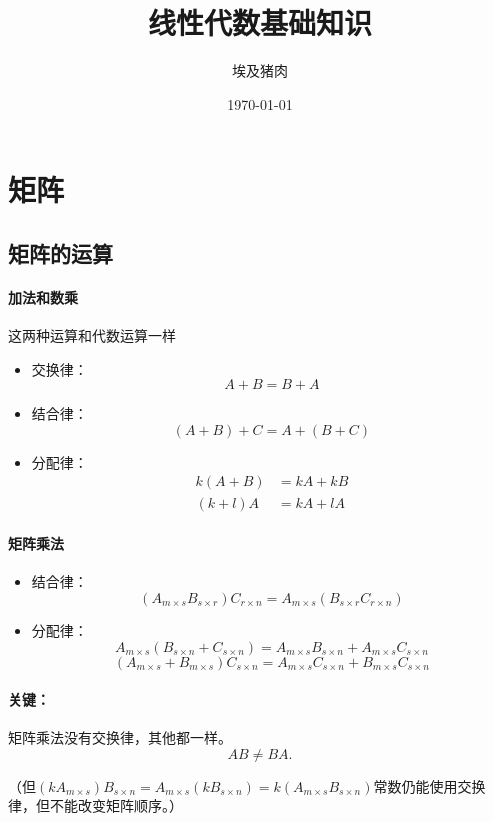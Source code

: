 \documentclass[UTF8]{ctexart}
\title{线性代数基础知识}
\author{埃及猪肉}
\date{\today}
\begin{document}
\maketitle
\tableofcontents

\section{矩阵}

\subsection{矩阵的运算}

\paragraph{加法和数乘}
这两种运算和代数运算一样
\begin{itemize}
    \item 交换律：
        \[A + B = B + A\]
    \item 结合律：
        \[(A + B) + C = A + (B + C)\]
    \item 分配律：
        \begin{align*}
        k(A + B) &= kA + kB \\
        (k + l)A &= kA + lA
        \end{align*}
\end{itemize}

\paragraph{矩阵乘法}
\begin{itemize}
    \item 结合律：
        \[
        (A_{m \times s} B_{s \times r}) C_{r \times n} = A_{m \times s} (B_{s \times r} C_{r \times n})
        \]
    \item 分配律：
        \[
        A_{m \times s} (B_{s \times n} + C_{s \times n}) = A_{m \times s} B_{s \times n} + A_{m \times s} C_{s \times n}
        \]
        \[
        (A_{m \times s} + B_{m \times s}) C_{s \times n} = A_{m \times s} C_{s \times n} + B_{m \times s} C_{s \times n}
        \]
\end{itemize}

{\color{red}
\paragraph{关键：}矩阵乘法没有交换律，其他都一样。
\[
AB \neq BA.
\]
}

（但$(kA_{m \times s}) B_{s \times n} = A_{m \times s} (kB_{s \times n}) = k (A_{m \times s} B_{s \times n})$常数仍能使用交换律，但不能改变矩阵顺序。）
\end{document}
